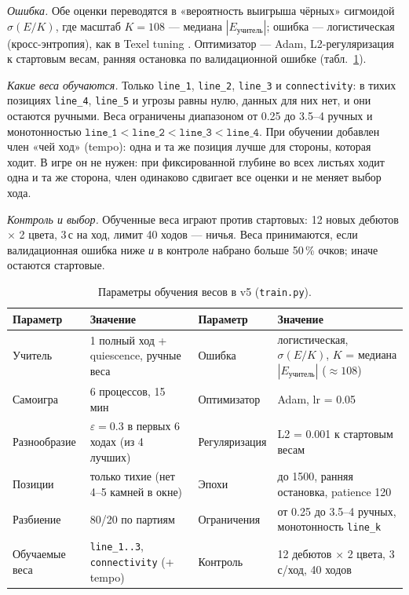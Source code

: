 \documentclass[a4paper,10pt,twocolumn]{article}
\newcommand{\code}[1]{\texttt{#1}}
\begin{document}
\emph{Ошибка.} Обе оценки переводятся в «вероятность выигрыша чёрных» сигмоидой $\sigma(E/K)$, где масштаб $K=108$ --- медиана $|E_{\text{учитель}}|$; ошибка --- логистическая (кросс-энтропия), как в Texel tuning \citep{texel}. Оптимизатор --- Adam, L2-регуляризация к стартовым весам, ранняя остановка по валидационной ошибке (табл.~\ref{tab:hyper}).

\emph{Какие веса обучаются.} Только \code{line\_1}, \code{line\_2}, \code{line\_3} и \code{connectivity}: в тихих позициях \code{line\_4}, \code{line\_5} и угрозы равны нулю, данных для них нет, и они остаются ручными. Веса ограничены диапазоном от 0.25 до 3.5--4 ручных и монотонностью $\code{line\_1}<\code{line\_2}<\code{line\_3}<\code{line\_4}$. При обучении добавлен член «чей ход» (tempo): одна и та же позиция лучше для стороны, которая ходит. В игре он не нужен: при фиксированной глубине во всех листьях ходит одна и та же сторона, член одинаково сдвигает все оценки и не меняет выбор хода.

\emph{Контроль и выбор.} Обученные веса играют против стартовых: 12 новых дебютов $\times$ 2 цвета, 3\,с на ход, лимит 40 ходов --- ничья. Веса принимаются, если валидационная ошибка ниже \emph{и} в контроле набрано больше 50\,\% очков; иначе остаются стартовые.

\begin{table}[t]
\centering
\caption{Параметры обучения весов в v5 (\code{train.py}).}
\label{tab:hyper}
\begin{tabularx}{\textwidth}{@{}lXlX@{}}
\toprule
Параметр & Значение & Параметр & Значение \\
\midrule
Учитель & 1 полный ход + quiescence, ручные веса & Ошибка & логистическая, $\sigma(E/K)$, $K$ = медиана $|E_{\text{учитель}}|$ ($\approx108$) \\
Самоигра & 6 процессов, 15 мин & Оптимизатор & Adam, lr = 0.05 \\
Разнообразие & $\varepsilon=0.3$ в первых 6 ходах (из 4 лучших) & Регуляризация & L2 = 0.001 к стартовым весам \\
Позиции & только тихие (нет 4--5 камней в окне) & Эпохи & до 1500, ранняя остановка, patience 120 \\
Разбиение & 80/20 по партиям & Ограничения & от 0.25 до 3.5--4 ручных, монотонность \code{line\_k} \\
Обучаемые веса & \code{line\_1..3}, \code{connectivity} (+ tempo) & Контроль & 12 дебютов $\times$ 2 цвета, 3\,с/ход, 40 ходов \\
\bottomrule
\end{tabularx}
\end{table}
\end{document}

